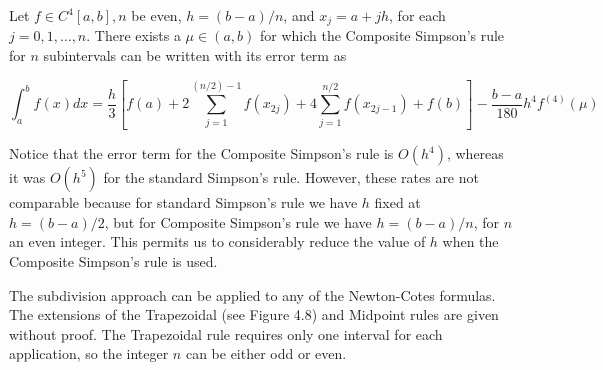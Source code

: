 \begin{theorem}
Let $f \in C^{4}[a, b], n$ be even, $h=(b-a) / n$, and $x_{j}=a+j h$, for each $j=0,1, \ldots, n$. There exists a $\mu \in(a, b)$ for which the Composite Simpson's rule for $n$ subintervals can be written with its error term as

$$
\int_{a}^{b} f(x) d x=\frac{h}{3}\left[f(a)+2 \sum_{j=1}^{(n / 2)-1} f\left(x_{2 j}\right)+4 \sum_{j=1}^{n / 2} f\left(x_{2 j-1}\right)+f(b)\right]-\frac{b-a}{180} h^{4} f^{(4)}(\mu)
$$
\end{theorem}
Notice that the error term for the Composite Simpson's rule is $O\left(h^{4}\right)$, whereas it was $O\left(h^{5}\right)$ for the standard Simpson's rule. However, these rates are not comparable because for standard Simpson's rule we have $h$ fixed at $h=(b-a) / 2$, but for Composite Simpson's rule we have $h=(b-a) / n$, for $n$ an even integer. This permits us to considerably reduce the value of $h$ when the Composite Simpson's rule is used.
%
%

The subdivision approach can be applied to any of the Newton-Cotes formulas. The extensions of the Trapezoidal (see Figure 4.8) and Midpoint rules are given without proof. The Trapezoidal rule requires only one interval for each application, so the integer $n$ can be either odd or even.

